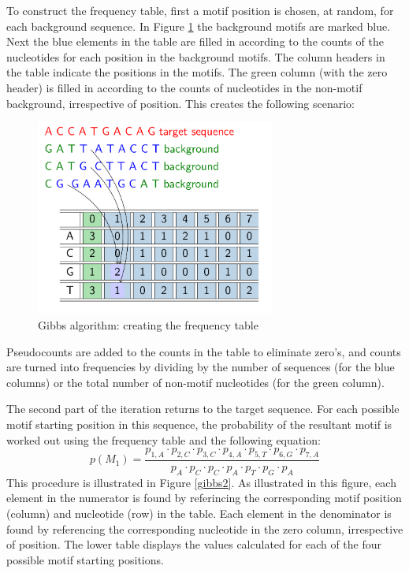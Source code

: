\documentclass[12pt]{article}
\begin{document}
To construct the frequency table, first a motif position is chosen, at random, for each background sequence. In Figure \ref{gibbs1} the background motifs are marked blue. Next the blue elements in the table are filled in according to the counts of the nucleotides for each position in the background motifs. The column headers in the table indicate the positions in the motifs. The green column (with the zero header) is filled in according to the counts of nucleotides in the non-motif background, irrespective of position. This creates the following scenario:

\begin{figure}[!htbp]
\centering
\includegraphics[width=0.7\textwidth]{GibbsTable.png}
\caption{Gibbs algorithm: creating the frequency table}\label{gibbs1}
\end{figure}

Pseudocounts are added to the counts in the table to eliminate zero's, and counts are turned into frequencies by dividing by the number of sequences (for the blue columns) or the total number of non-motif nucleotides (for the green column).

The second part of the iteration returns to the target sequence. For each possible motif starting position in this sequence, the probability of the resultant motif is worked out using the frequency table and the following equation: 
\begin{equation}
p(M_{1}) = \frac{p_{1,A} \cdot p_{2,C} \cdot p_{3,C} \cdot p_{4,A} \cdot p_{5,T} \cdot p_{6,G} \cdot p_{7,A}}{p_{A} \cdot p_{C} \cdot p_{C} \cdot p_{A} \cdot p_{T} \cdot p_{G} \cdot p_{A}}
\end{equation}
This procedure is illustrated in Figure \ref{gibbs2}. As illustrated in this figure, each element in the numerator is found by referincing the corresponding motif position (column) and nucleotide (row) in the table. Each element in the denominator is found by referencing the corresponding nucleotide in the zero column, irrespective of position. The lower table displays the values calculated for each of the four possible motif starting positions.  
\end{document}
